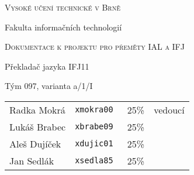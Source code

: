 \thispagestyle{empty}

\begin{center}
\Large{\scshape Vysoké učení technické v Brně}

\vspace{0.5cm}

\large{Fakulta informačních technologií}

\vfill

\Large{\scshape Dokumentace k projektu pro přeměty IAL a IFJ}

%

\vfill

\LARGE{Překladač jazyka IFJ11}

\vfill

\large{Tým 097, varianta a/1/I}
\end{center}

\vspace{0.5cm}

\begin{tabular}{l l r l}
Radka Mokrá  & \tt{xmokra00} & 25\% & vedoucí \\ 
Lukáš Brabec & \tt{xbrabe09} & 25\% & \\
Aleš Dujíček & \tt{xdujic01} & 25\% & \\
Jan Sedlák   & \tt{xsedla85} & 25\% & \\
\end{tabular}


\newpage{}
